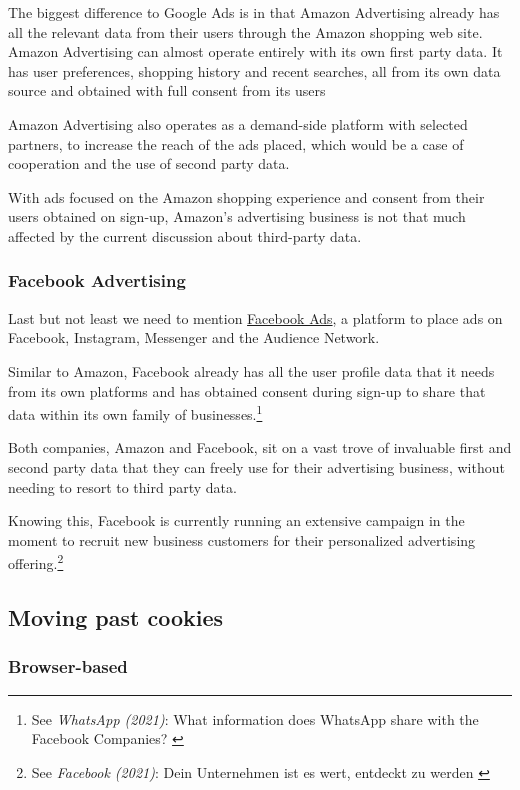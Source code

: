 The biggest difference to Google Ads is in that Amazon Advertising already has all the relevant data from their users through the Amazon shopping web site. Amazon Advertising can almost operate entirely with its own first party data. It has user preferences, shopping history and recent searches, all from its own data source and obtained with full consent from its users

Amazon Advertising also operates as a demand-side platform with selected partners, to increase the reach of the ads placed, which would be a case of cooperation and the use of second party data.

With ads focused on the Amazon shopping experience and consent from their users obtained on sign-up, Amazon's advertising business is not that much affected by the current discussion about third-party data.

\subsubsection{Facebook Advertising}

Last but not least we need to mention \href{https://www.facebook.com/business/ads}{Facebook Ads}, a platform to place ads on Facebook, Instagram, Messenger and the Audience Network.

Similar to Amazon, Facebook already has all the user profile data that it needs from its own platforms and has obtained consent during sign-up to share that data within its own family of businesses.\footnote{See \textit{WhatsApp (2021)}: What information does WhatsApp share with the Facebook Companies? \cite{whatsApp}}

Both companies, Amazon and Facebook, sit on a vast trove of invaluable first and second party data that they can freely use for their advertising business, without needing to resort to third party data.

Knowing this, Facebook is currently running an extensive campaign in the moment to recruit new business customers for their personalized advertising offering.\footnote{See \textit{Facebook (2021)}: Dein Unternehmen ist es wert, entdeckt zu werden \cite{facebookAds}}

\subsection{Moving past cookies}

\subsubsection{Browser-based}


